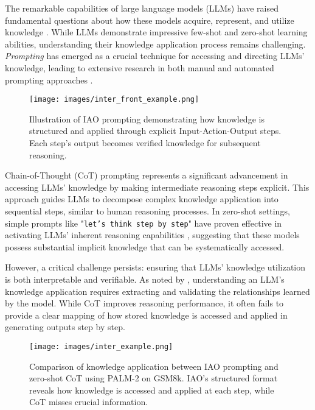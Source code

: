 The remarkable capabilities of large language models (LLMs) \cite{vaswani_attention_2017,devlin_bert_2019,raffel2020exploring,brown2020language,chowdhery2023palm} have raised fundamental questions about how these models acquire, represent, and utilize knowledge \cite{ju-etal-2024-large,meng2022locating,turpin2024language,zhang2024knowledge}. While LLMs demonstrate impressive few-shot and zero-shot learning abilities, understanding their knowledge application process remains challenging. \textit{Prompting} \cite{liu2023pre} has emerged as a crucial technique for accessing and directing LLMs' knowledge, leading to extensive research in both manual \cite{schick-schutze-2021-just,reynolds2021prompt} and automated prompting approaches \cite{gao-etal-2021-making,shin-etal-2020-autoprompt}.

\begin{figure}[ht]
\centering
\texttt{[image: images/inter\_front\_example.png]}
\label{fig:iao_front}
\caption{Illustration of IAO prompting demonstrating how knowledge is structured and applied through explicit Input-Action-Output steps. Each step's output becomes verified knowledge for subsequent reasoning.}
\end{figure}

Chain-of-Thought (CoT) prompting \cite{wei2022chain,wang-etal-2022-iteratively} represents a significant advancement in accessing LLMs' knowledge by making intermediate reasoning steps explicit. This approach guides LLMs to decompose complex knowledge application into sequential steps, similar to human reasoning processes. In zero-shot settings, simple prompts like "\texttt{let's think step by step}" have proven effective in activating LLMs' inherent reasoning capabilities \citep{kojima2022large}, suggesting that these models possess substantial implicit knowledge that can be systematically accessed.

However, a critical challenge persists: ensuring that LLMs' knowledge utilization is both interpretable and verifiable. As noted by \citet{singh2024rethinking}, understanding an LLM's knowledge application requires extracting and validating the relationships learned by the model. While CoT improves reasoning performance, it often fails to provide a clear mapping of how stored knowledge is accessed and applied in generating outputs step by step.

\begin{figure*}[ht]
\texttt{[image: images/inter\_example.png]}
\caption{Comparison of knowledge application between IAO prompting and zero-shot CoT using PALM-2 on GSM8k. IAO's structured format reveals how knowledge is accessed and applied at each step, while CoT misses crucial information.}
\label{fig:iao_example_fig}
\end{figure*}

